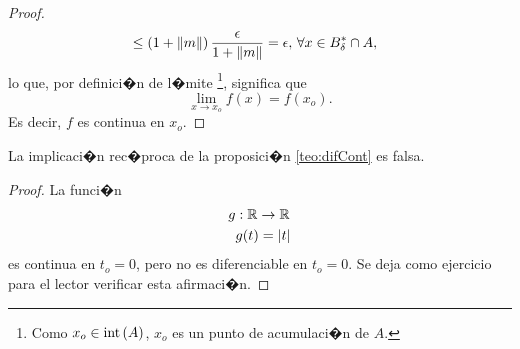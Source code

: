 \documentclass[a4paper]{scrartcl} %
\begin{document}
\begin{theorem}
\begin{proof}
\begin{align*}
                       &\le \left( 1 + \norm{m} \right) \frac{\epsilon}{1 + \norm{m}} = \epsilon, 
                       \, \forall x \in B^*_{\delta} \cap A,
\end{align*}
lo que, por definici�n de l�mite \footnote{Como $x_o \in \operatorname{int}{(A)}$, $x_o$ es un punto de acumulaci�n de $A$. }, significa que 
\[
 \lim_{x \to x_o}f(x) = f(x_o).
\]
Es decir, $f$ es continua en $x_o$.
\end{proof}
\begin{obs} La implicaci�n rec�proca de la proposici�n \eqref{teo:difCont} es falsa. 
 \begin{proof} La funci�n
  \begin{align*}
      g & :\mathbb{R} \to \mathbb{R} \\
        & g(t) = \abs{t}
 \end{align*}
es continua en $t_o = 0$, pero no es diferenciable en $t_o = 0$. Se deja como ejercicio para el lector verificar esta afirmaci�n.
 \end{proof}
\end{obs}
\end{theorem}
\end{document}
